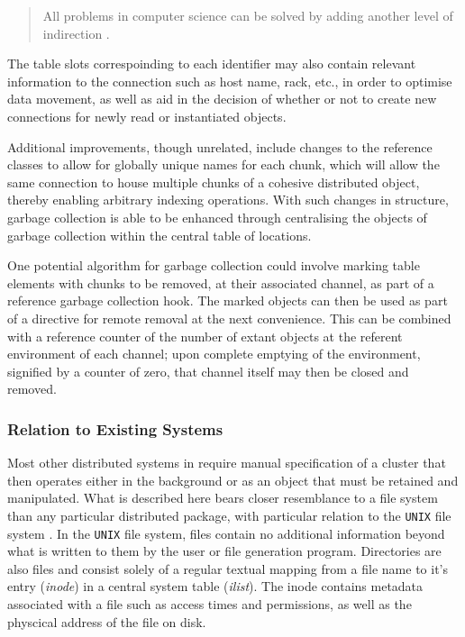 \begin{quote}
All problems in computer science can be solved by adding another level
of indirection \cite{oram2007beautiful}.
\end{quote}

The table slots correspoinding to each identifier may also contain
relevant information to the connection such as host name, rack, etc., in
order to optimise data movement, as well as aid in the decision of
whether or not to create new connections for newly read or instantiated
objects.

Additional improvements, though unrelated, include changes to the
reference classes to allow for globally unique names for each chunk,
which will allow the same connection to house multiple chunks of a
cohesive distributed object, thereby enabling arbitrary indexing
operations. With such changes in structure, garbage collection is able
to be enhanced through centralising the objects of garbage collection
within the central table of locations.

One potential algorithm for garbage collection could involve marking
table elements with chunks to be removed, at their associated channel,
as part of a reference garbage collection hook. The marked objects can
then be used as part of a directive for remote removal at the next
convenience. This can be combined with a reference counter of the number
of extant objects at the referent environment of each channel; upon
complete emptying of the environment, signified by a counter of zero,
that channel itself may then be closed and removed.

\hypertarget{sec:localrel}{%
\subsubsection{Relation to Existing Systems}\label{sec:localrel}}

Most other distributed systems in \R require manual specification of a
cluster that then operates either in the background or as an object that
must be retained and manipulated. What is described here bears closer
resemblance to a file system than any particular distributed \R package,
with particular relation to the \texttt{UNIX} file system
\cite{ritchie1979evolution}\cite{thompson1974unix}. In the \texttt{UNIX}
file system, files contain no additional information beyond what is
written to them by the user or file generation program. Directories are
also files and consist solely of a regular textual mapping from a file
name to it's entry (\emph{inode}) in a central system table
(\emph{ilist}). The inode contains metadata associated with a file such
as access times and permissions, as well as the physcical address of the
file on disk.

